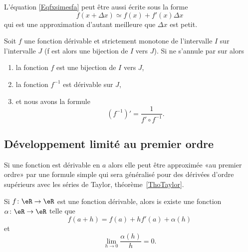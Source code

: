 L'équation \eqref{Eqfxsimesfa} peut être aussi écrite sous la forme
\begin{equation}		\label{EqfxdxSimeqfxfpx}
	f(x+\Delta x)\simeq f(x)+f'(x)\Delta x
\end{equation}
qui est une approximation d'autant meilleure que $\Delta x$ est petit.

\begin{proposition}      \label{PROPooSGTBooFxUuXK}
    Soit \(f \) une fonction dérivable et strictement monotone de l'intervalle \( I\) sur l'intervalle \( J\)  (f est alors une bijection de $I$ vers $J$). Si  ne s'annule par sur  alors
    \begin{enumerate}
        \item
            la fonction \( f\) est une bijection de \( I\) vers \( J\),
        \item
            la fonction \( f^{-1}\) est dérivable sur \( J\),
        \item
            et nous avons la formule
            \begin{equation}        \label{EQooELIHooDxUFxH}
                (f^{-1})'=\frac{1}{ f'\circ f^{-1} }.
            \end{equation}
    \end{enumerate}
\end{proposition}

\subsection{Développement limité au premier ordre}

Si une fonction est dérivable en \( a\) alors elle peut être approximée «au premier ordre» par une formule simple qui sera généralisé pour des dérivées d'ordre supérieurs avec les séries de Taylor, théorème~\ref{ThoTaylor}.
\begin{proposition}  \label{PropUTenzfQ}
    Si \( f\colon \eR\to \eR\) est une fonction dérivable, alors is existe une fonction \( \alpha\colon \eR\to \eR\) telle que
    \begin{equation}
        f(a+h)=f(a)+hf'(a)+\alpha(h)
    \end{equation}
    et
    \begin{equation}
        \lim_{h\to 0} \frac{ \alpha(h) }{ h }=0.
    \end{equation}
\end{proposition}

